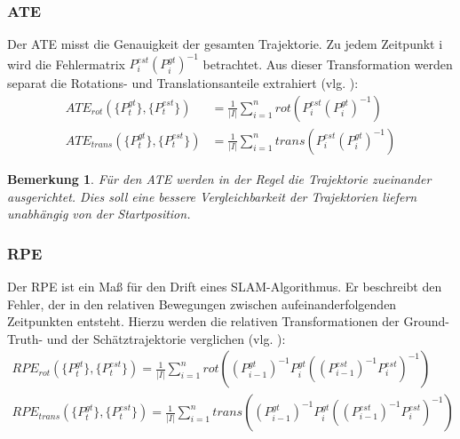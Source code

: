 \documentclass[12pt,DIV=15,BCOR=15mm,twoside,headsepline,abstract=true,listof=totoc,bibliography=totoc]{scrreprt}
\newtheorem{remark}{Bemerkung}[chapter]
\theoremstyle{remark}    %
\begin{document}
    \subsubsection{ATE}
    Der \ac{ATE} misst die Genauigkeit der gesamten Trajektorie. Zu jedem Zeitpunkt i wird die Fehlermatrix $P_i^{est}(P_i^{gt})^{-1}$ betrachtet. 
    Aus dieser Transformation werden separat die Rotations- und Translationsanteile extrahiert (vlg. \cite{sturm12iros}): 
     \begin{align*}
        ATE_{rot}(\{P^{gt}_t\}, \{P^{est}_t\}) &= \frac{1}{|I|}\sum_{i = 1}^{n} rot(P_i^{est}(P_i^{gt})^{-1})\\
        ATE_{trans}(\{P^{gt}_t\}, \{P^{est}_t\}) &= \frac{1}{|I|}\sum_{i = 1}^{n} trans(P_i^{est}(P_i^{gt})^{-1})
    \end{align*}
    \begin{remark}
        Für den \ac{ATE} werden in der Regel die Trajektorie zueinander ausgerichtet. Dies soll eine bessere Vergleichbarkeit der Trajektorien liefern
        unabhängig von der Startposition.\cite{sturm12iros}
    \end{remark}

    \subsubsection{RPE}
    Der \ac{RPE} ist ein Maß für den Drift eines \ac{SLAM}-Algorithmus. Er beschreibt den Fehler, der in den relativen Bewegungen zwischen aufeinanderfolgenden 
    Zeitpunkten entsteht. Hierzu werden die relativen Transformationen der Ground-Truth- und der Schätztrajektorie verglichen (vlg. \cite{sturm12iros}):
    \begin{align*}
        RPE_{rot}(\{P^{gt}_t\}, \{P^{est}_t\}) = \frac{1}{|I|} \sum_{i = 1}^{n} rot ((P_{i-1}^{gt})^{-1}P_{i}^{gt}\left((P^{est}_{i-1})^{-1}P^{est}_i\right)^{-1})\\
        RPE_{trans}(\{P^{gt}_t\}, \{P^{est}_t\}) = \frac{1}{|I|} \sum_{i = 1}^{n}  trans((P_{i-1}^{gt})^{-1}P_{i}^{gt}\left((P^{est}_{i-1})^{-1}P^{est}_i\right)^{-1})\\
    \end{align*}
\end{document}
